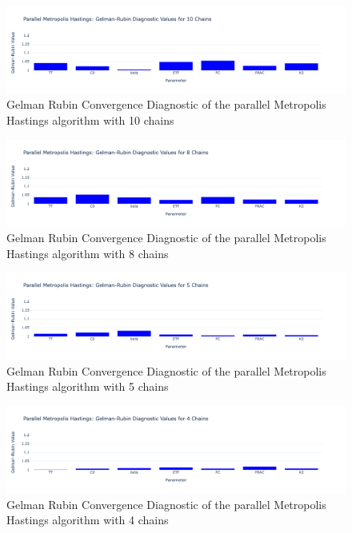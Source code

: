 \begin{figure}[H]
    \centering
    \includegraphics[width=1\textwidth]{figures/parallel_mh/GR_10.png}
    \captionsetup{width=.8\textwidth}
    \caption{Gelman Rubin Convergence Diagnostic of the parallel Metropolis Hastings algorithm with 10 chains}
    \label{fig:enter-label}
\end{figure}

\begin{figure}[H]
    \centering
    \includegraphics[width=1\textwidth]{figures/parallel_mh/GR_8.png}
    \captionsetup{width=.8\textwidth}
    \caption{Gelman Rubin Convergence Diagnostic of the parallel Metropolis Hastings algorithm with 8 chains}
    \label{fig:enter-label}
\end{figure}

\begin{figure}[H]
    \centering
    \includegraphics[width=1\textwidth]{figures/parallel_mh/GR_5.png}
    \captionsetup{width=.8\textwidth}
    \caption{Gelman Rubin Convergence Diagnostic of the parallel Metropolis Hastings algorithm with 5 chains}
    \label{fig:enter-label}
\end{figure}

\begin{figure}[H]
    \centering
    \includegraphics[width=1\textwidth]{figures/parallel_mh/GR_4.png}
    \captionsetup{width=.8\textwidth}
    \caption{Gelman Rubin Convergence Diagnostic of the parallel Metropolis Hastings algorithm with 4 chains}
    \label{fig:enter-label}
\end{figure}

